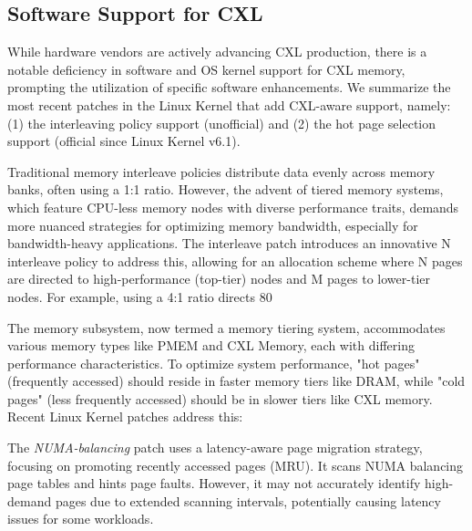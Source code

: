 \subsection{Software Support for CXL} \label{ssec
}

While hardware vendors are actively advancing CXL production, there is a notable deficiency in software and OS kernel support for CXL memory, prompting the utilization of specific software enhancements. We summarize the most recent patches in the Linux Kernel that add CXL-aware support, namely: (1) the interleaving policy support (unofficial) and (2) the hot page selection support (official since Linux Kernel v6.1).

 Traditional memory interleave policies distribute data evenly across memory banks, often using a 1:1 ratio. However, the advent of tiered memory systems, which feature CPU-less memory nodes with diverse performance traits, demands more nuanced strategies for optimizing memory bandwidth, especially for bandwidth-heavy applications. The interleave patch introduces an innovative N
interleave policy to address this, allowing for an allocation scheme where N pages are directed to high-performance (top-tier) nodes and M pages to lower-tier nodes. For example, using a 4:1 ratio directs 80%

 The memory subsystem, now termed a memory tiering system, accommodates various memory types like PMEM and CXL Memory, each with differing performance characteristics. To optimize system performance, "hot pages" (frequently accessed) should reside in faster memory tiers like DRAM, while "cold pages" (less frequently accessed) should be in slower tiers like CXL memory. Recent Linux Kernel patches address this:

The \textit{NUMA-balancing} patch uses a latency-aware page migration strategy, focusing on promoting recently accessed pages (MRU). It scans NUMA balancing page tables and hints page faults. However, it may not accurately identify high-demand pages due to extended scanning intervals, potentially causing latency issues for some workloads.

